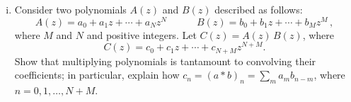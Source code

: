 \begin{enumerate}[(a)]
\begin{enumerate}[(i)]
{        Lastly, 
         \begin{equation*}
            c[n] = c_0\delta[n] + c_1 \delta[n - 1] + ... + c_{N + M} \delta[n - ( N + M)]
        \end{equation*}
        
    }

\item Consider two polynomials $A(z)$ and $B(z)$ described as follows:
    $$
    A(z) = a_0 +a_1 z + \cdots + a_N z^N \quad \quad \quad B(z) = b_0 +b_1 z + \cdots + b_M z^M \, ,
    $$
    where $M$ and $N$ and positive integers.
    Let $C(z)=A(z)\, B(z)$, where $$ C(z) = c_0 +c_1 z + \cdots + c_{N+M} z^{N+M}.$$  Show that multiplying polynomials is tantamount to convolving their coefficients; in particular, explain how $c_n=(a*b)_n=\displaystyle\sum_m a_m b_{n-m}$, where $n={0,1,\ldots, N+M}$.
    

\end{enumerate}
\end{enumerate}